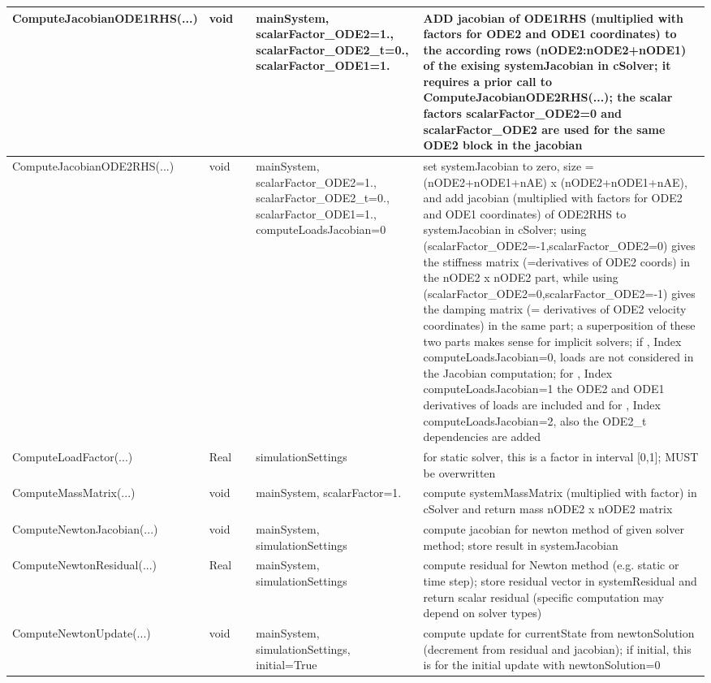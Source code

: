\begin{center}
\begin{longtable}{| p{4.2cm} | p{2.5cm} | p{0.3cm} | p{3.0cm} | p{6cm} |}
    ComputeJacobianODE1RHS(...) &     void &      &     mainSystem, scalarFactor\_ODE2=1., scalarFactor\_ODE2\_t=0., scalarFactor\_ODE1=1. &     ADD jacobian of ODE1RHS (multiplied with factors for ODE2 and ODE1 coordinates) to the according rows (nODE2:nODE2+nODE1) of the exising systemJacobian in cSolver; it requires a prior call to ComputeJacobianODE2RHS(...); the scalar factors scalarFactor\_ODE2=0 and scalarFactor\_ODE2 are used for the same ODE2 block in the jacobian\\ \hline
    ComputeJacobianODE2RHS(...) &     void &      &     mainSystem, scalarFactor\_ODE2=1., scalarFactor\_ODE2\_t=0., scalarFactor\_ODE1=1., computeLoadsJacobian=0 &     set systemJacobian to zero, size = (nODE2+nODE1+nAE) x (nODE2+nODE1+nAE), and add jacobian (multiplied with factors for ODE2 and ODE1 coordinates) of ODE2RHS to systemJacobian in cSolver; using (scalarFactor\_ODE2=-1,scalarFactor\_ODE2=0) gives the stiffness matrix (=derivatives of ODE2 coords) in the nODE2 x nODE2 part, while using (scalarFactor\_ODE2=0,scalarFactor\_ODE2=-1) gives the damping matrix (= derivatives of ODE2 velocity coordinates) in the same part; a superposition of these two parts makes sense for implicit solvers; if , Index computeLoadsJacobian=0, loads are not considered in the Jacobian computation; for , Index computeLoadsJacobian=1 the ODE2 and ODE1 derivatives of loads are included and for , Index computeLoadsJacobian=2, also the ODE2\_t dependencies are added\\ \hline
    ComputeLoadFactor(...) &     Real &      &     simulationSettings &     for static solver, this is a factor in interval [0,1]; MUST be overwritten\\ \hline
    ComputeMassMatrix(...) &     void &      &     mainSystem, scalarFactor=1. &     compute systemMassMatrix (multiplied with factor) in cSolver and return mass nODE2 x nODE2 matrix\\ \hline
    ComputeNewtonJacobian(...) &     void &      &     mainSystem, simulationSettings &     compute jacobian for newton method of given solver method; store result in systemJacobian\\ \hline
    ComputeNewtonResidual(...) &     Real &      &     mainSystem, simulationSettings &     compute residual for Newton method (e.g. static or time step); store residual vector in systemResidual and return scalar residual (specific computation may depend on solver types)\\ \hline
    ComputeNewtonUpdate(...) &     void &      &     mainSystem, simulationSettings, initial=True &     compute update for currentState from newtonSolution (decrement from residual and jacobian); if initial, this is for the initial update with newtonSolution=0\\ \hline

\end{longtable}
\end{center}

